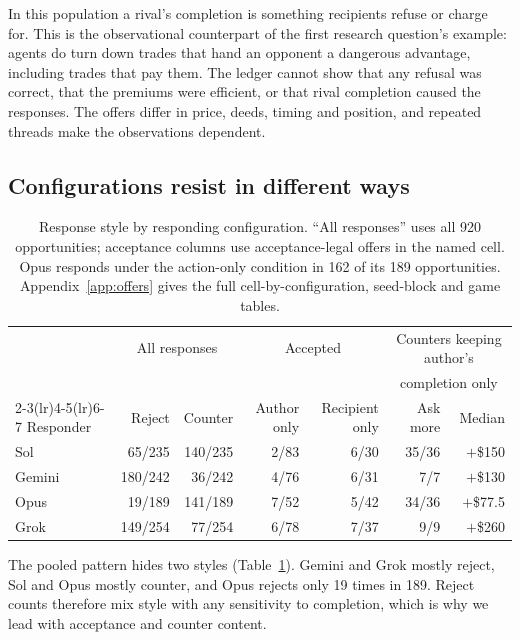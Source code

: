 In this population a rival's completion is something recipients refuse or charge for. This is the observational counterpart of the first research question's example: agents do turn down trades that hand an opponent a dangerous advantage, including trades that pay them. The ledger cannot show that any refusal was correct, that the premiums were efficient, or that rival completion caused the responses. The offers differ in price, deeds, timing and position, and repeated threads make the observations dependent.

\subsection{Configurations resist in different ways}
\label{sec:config-heterogeneity}

\begin{table}[htbp]
\centering\small
\begin{tabular}{@{}lrrrrrr@{}}
\toprule
& \multicolumn{2}{c}{All responses} & \multicolumn{2}{c}{Accepted} & \multicolumn{2}{c}{Counters keeping author's}\\
& \multicolumn{2}{c}{} & \multicolumn{2}{c}{} & \multicolumn{2}{c}{completion only}\\
\cmidrule(lr){2-3}\cmidrule(lr){4-5}\cmidrule(lr){6-7}
Responder & Reject & Counter & Author only & Recipient only & Ask more & Median\\
\midrule
Sol & 65/235 & 140/235 & 2/83 & 6/30 & 35/36 & $+$\$150\\
Gemini & 180/242 & 36/242 & 4/76 & 6/31 & 7/7 & $+$\$130\\
Opus & 19/189 & 141/189 & 7/52 & 5/42 & 34/36 & $+$\$77.5\\
Grok & 149/254 & 77/254 & 6/78 & 7/37 & 9/9 & $+$\$260\\
\bottomrule
\end{tabular}
\caption{Response style by responding configuration. ``All responses'' uses all 920 opportunities; acceptance columns use acceptance-legal offers in the named cell. Opus responds under the action-only condition in 162 of its 189 opportunities. Appendix~\ref{app:offers} gives the full cell-by-configuration, seed-block and game tables.}
\label{tab:responders}
\end{table}

The pooled pattern hides two styles (Table~\ref{tab:responders}). Gemini and Grok mostly reject, Sol and Opus mostly counter, and Opus rejects only 19 times in 189. Reject counts therefore mix style with any sensitivity to completion, which is why we lead with acceptance and counter content.

